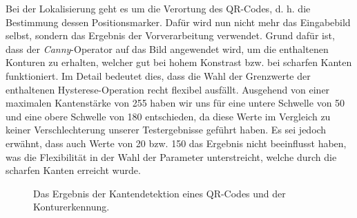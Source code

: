 \documentclass[a4paper, oneside, 12pt]{article}
\begin{document}
Bei der Lokalisierung geht es um die Verortung des QR-Codes, d. h. die Bestimmung dessen Positionsmarker. Dafür wird nun nicht mehr das Eingabebild selbst, sondern das Ergebnis der Vorverarbeitung verwendet.
Grund dafür ist, dass der \emph{Canny}-Operator \cite{canny1986computational} auf das Bild angewendet wird, um die enthaltenen Konturen zu erhalten, welcher gut bei hohem Konstrast bzw. bei scharfen Kanten funktioniert. Im Detail bedeutet dies, dass die Wahl der Grenzwerte der enthaltenen Hysterese-Operation recht flexibel ausfällt. Ausgehend von einer maximalen Kantenstärke von 255 haben wir uns für eine untere Schwelle von 50 und eine obere Schwelle von 180 entschieden, da diese Werte im Vergleich zu keiner Verschlechterung unserer Testergebnisse geführt haben. Es sei jedoch erwähnt, dass auch Werte von 20 bzw. 150 das Ergebnis nicht beeinflusst haben, was die Flexibilität in der Wahl der Parameter unterstreicht, welche durch die scharfen Kanten erreicht wurde.

\begin{figure}[h]
	\begin{center}
	\end{center}
	\caption[Das Ergebnis von Kantendetektion und Konturerkennung]{Das Ergebnis der Kantendetektion eines QR-Codes und der Konturerkennung.}
	\label{fig:lokalisierung}
\end{figure}
\end{document}
